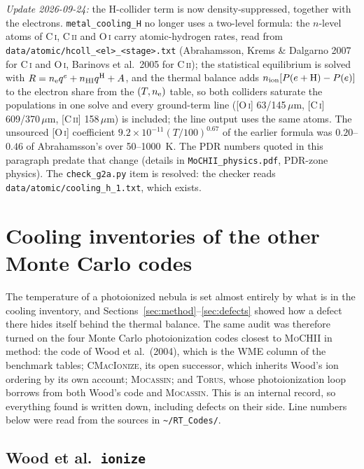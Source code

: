 \documentclass[english,a4paper]{my_memo}
\newcommand{\code}[1]{\texttt{#1}}
\newcommand{\MoCHII}{\textsc{MoCHII}}
\newcommand{\Mocassin}{\textsc{Mocassin}}
\newcommand{\CMI}{\textsc{CMacIonize}}
\newcommand{\Torus}{\textsc{Torus}}
\newcommand{\OI}{O\,\textsc{i}}
\newcommand{\CI}{C\,\textsc{i}}
\newcommand{\CII}{C\,\textsc{ii}}
\newcommand{\nel}{n_{\rm e}}
\begin{document}
\emph{Update 2026-09-24:} the H-collider term is now density-suppressed,
together with the electrons.  \code{metal\_cooling\_H} no longer uses a
two-level formula: the $n$-level atoms of \CI{}, \CII{} and \OI{} carry
atomic-hydrogen rates, read from
\code{data/\allowbreak atomic/\allowbreak hcoll\_<el>\_<stage>.txt}
(Abrahamsson, Krems \& Dalgarno 2007 for \CI{} and \OI{}, Barinovs et al.\
2005 for \CII{}); the statistical equilibrium is solved with
$R = \nel q^e + n_{\rm HI} q^{\rm H} + A$, and the thermal balance adds
$n_{\rm ion}[P(e+{\rm H}) - P(e)]$ to the electron share from the
$(T, \nel)$ table, so both colliders saturate the populations in one solve
and every ground-term line ([\OI{}] 63/145\,$\mu$m, [\CI{}]
609/370\,$\mu$m, [\CII{}] 158\,$\mu$m) is included; the line output uses the
same atoms.  The unsourced [\OI{}] coefficient
$9.2{\times}10^{-11}(T/100)^{0.67}$ of the earlier formula was
$0.20$--$0.46$ of Abrahamsson's over 50--1000~K.  The PDR numbers quoted in
this paragraph predate that change (details in \code{MoCHII\_physics.pdf},
PDR-zone physics).  The \code{check\_g2a.py} item is resolved: the checker
reads \code{data/atomic/cooling\_h\_1.txt}, which exists.

\section{Cooling inventories of the other Monte Carlo codes}
\label{sec:others}

The temperature of a photoionized nebula is set almost entirely by what is in
the cooling inventory, and Sections~\ref{sec:method}--\ref{sec:defects} showed
how a defect there hides itself behind the thermal balance.  The same audit was
therefore turned on the four Monte Carlo photoionization codes closest to
\MoCHII{} in method: the code of Wood et al.\ (2004), which is the WME column
of the benchmark tables; \CMI{}, its open successor, which inherits Wood's ion
ordering by its own account; \Mocassin{}; and \Torus{}, whose photoionization
loop borrows from both Wood's code and \Mocassin{}.  This is an internal record, so
everything found is written down, including defects on their side.  Line
numbers below were read from the sources in
\code{\textasciitilde/RT\_Codes/}.

\subsection{Wood et al.\ \code{ionize}}
\end{document}
